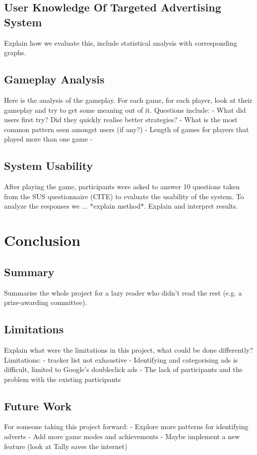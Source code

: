 \documentclass{l4proj}
\begin{document}
\section{User Knowledge Of Targeted Advertising System}
Explain how we evaluate this, include statistical analysis with corresponding graphs.

\section{Gameplay Analysis}
Here is the analysis of the gameplay. For each game, for each player, look at their gameplay and try to get some meaning out of it.
Questions include:
 - What did users first try? Did they quickly realise better strategies?
 - What is the most common pattern seen amongst users (if any?)
 - Length of games for players that played more than one game
 - 

\section{System Usability}
After playing the game, participants were asked to answer 10 questions taken from the SUS questionnaire (CITE) to evaluate the usability of the system. To analyze the responses we ... *explain method*. Explain and 
interpret results. 

\chapter{Conclusion}    

\section{Summary}
Summarise the whole project for a lazy reader who didn't read the rest (e.g. a prize-awarding committee).

\section{Limitations}
Explain what were the limitations in this project, what could be done differently? 
Limitations:
 - tracker list not exhaustive
 - Identifying and categorising ads is difficult, limited to Google's doubleclick ads
 - The lack of participants and the problem with the existing participants

\section{Future Work}
For someone taking this project forward:
 - Explore more patterns for identifying adverts
 - Add more game modes and achievements
 - Maybe implement a new feature (look at Tally saves the internet)
\end{document}
